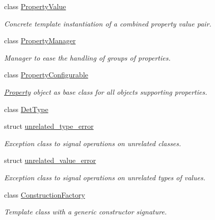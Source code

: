 \begin{DoxyCompactItemize}
class \hyperlink{class_d_d4hep_1_1_property_value}{PropertyValue}
\begin{DoxyCompactList}\small\item\em Concrete template instantiation of a combined property value pair. \item\end{DoxyCompactList}\item 
class \hyperlink{class_d_d4hep_1_1_property_manager}{PropertyManager}
\begin{DoxyCompactList}\small\item\em Manager to ease the handling of groups of properties. \item\end{DoxyCompactList}\item 
class \hyperlink{class_d_d4hep_1_1_property_configurable}{PropertyConfigurable}
\begin{DoxyCompactList}\small\item\em \hyperlink{class_d_d4hep_1_1_property}{Property} object as base class for all objects supporting properties. \item\end{DoxyCompactList}\item 
class \hyperlink{class_d_d4hep_1_1_det_type}{DetType}
\item 
struct \hyperlink{struct_d_d4hep_1_1unrelated__type__error}{unrelated\_\-type\_\-error}
\begin{DoxyCompactList}\small\item\em Exception class to signal operations on unrelated classes. \item\end{DoxyCompactList}\item 
struct \hyperlink{struct_d_d4hep_1_1unrelated__value__error}{unrelated\_\-value\_\-error}
\begin{DoxyCompactList}\small\item\em Exception class to signal operations on unrelated types of values. \item\end{DoxyCompactList}\item 
class \hyperlink{class_d_d4hep_1_1_construction_factory}{ConstructionFactory}
\begin{DoxyCompactList}\small\item\em Template class with a generic constructor signature. \item\end{DoxyCompactList}\item 

\end{DoxyCompactItemize}
